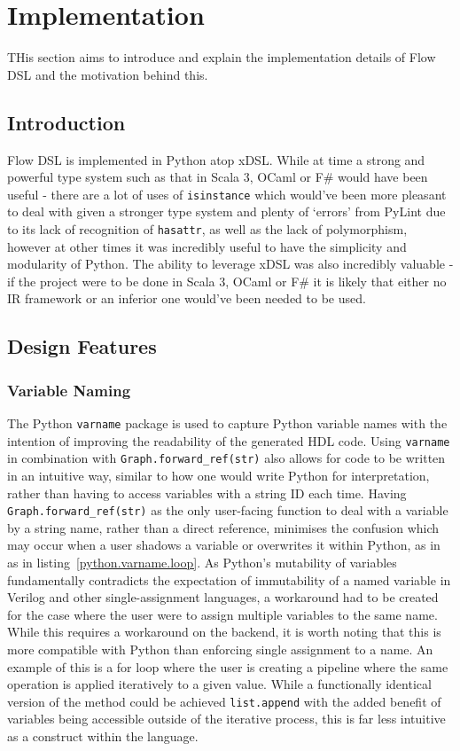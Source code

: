 \chapter{Implementation}\label{chap:compilation}
THis section aims to introduce and explain the implementation details of Flow DSL and the motivation behind this.

\section{Introduction}
Flow DSL is implemented in Python atop xDSL. While at time a strong and powerful type system such as that in Scala 3, OCaml or F\# would have been useful \hyphen{} there are a lot of uses of \lstinline|isinstance| which would've been more pleasant to deal with given a stronger type system and plenty of `errors' from PyLint due to its lack of recognition of \lstinline|hasattr|, as well as the lack of polymorphism, however at other times it was incredibly useful to have the simplicity and modularity of Python. The ability to leverage xDSL was also incredibly valuable \hyphen{} if the project were to be done in Scala 3, OCaml or F\# it is likely that either no IR framework or an inferior one would've been needed to be used.

\section{Design Features}

\subsection{Variable Naming}\label{varname}
The Python \lstinline|varname| package is used to capture Python variable names with the intention of improving the readability of the generated HDL code. Using \lstinline|varname| in combination with \lstinline|Graph.forward_ref(str)| also allows for code to be written in an intuitive way, similar to how one would write Python for interpretation, rather than having to access variables with a string ID each time. Having \lstinline|Graph.forward_ref(str)| as the only user-facing function to deal with a variable by a string name, rather than a direct reference, minimises the confusion which may occur when a user shadows a variable or overwrites it within Python, as in as in listing \ref{python.varname.loop}. As Python's mutability of variables fundamentally contradicts the expectation of immutability of a named variable in Verilog and other single-assignment languages, a workaround had to be created for the case where the user were to assign multiple variables to the same name. While this requires a workaround on the backend, it is worth noting that this is more compatible with Python than enforcing single assignment to a name. An example of this is a for loop where the user is creating a pipeline where the same operation is applied iteratively to a given value. While a functionally identical version of the method could be achieved \lstinline|list.append| with the added benefit of variables being accessible outside of the iterative process, this is far less intuitive as a construct within the language.

